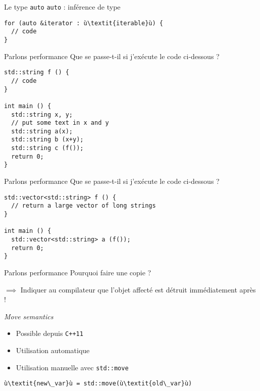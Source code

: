 \begin{frame}[fragile]{Le type \texttt{auto}}
  \texttt{auto} : inférence de type
  
  \begin{lstlisting}[escapechar=ù]
for (auto &iterator : ù\textit{iterable}ù) {
  // code
}
  \end{lstlisting}
\end{frame}

\begin{frame}[fragile]{Parlons performance}
  Que se passe-t-il si j'exécute le code ci-dessous ?
  
  \begin{lstlisting}
std::string f () {
  // code
}

int main () {
  std::string x, y;
  // put some text in x and y
  std::string a(x);
  std::string b (x+y);
  std::string c (f());
  return 0;
}
  \end{lstlisting}
\end{frame}

\begin{frame}[fragile]{Parlons performance}
  Que se passe-t-il si j'exécute le code ci-dessous ?
  
  \begin{lstlisting}
std::vector<std::string> f () {
  // return a large vector of long strings
}

int main () {
  std::vector<std::string> a (f());
  return 0;
}
  \end{lstlisting}
\end{frame}

\begin{frame}{Parlons performance}
  Pourquoi faire une copie ?

  $\implies$ Indiquer au compilateur que l'objet affecté est détruit immédiatement après !
\end{frame}

\begin{frame}[fragile]{\textit{Move semantics}}
  \begin{itemize}
  \item Possible depuis \texttt{C++11}
  \item Utilisation automatique
  \item Utilisation manuelle avec \texttt{std::move}
  \end{itemize}
  
  \begin{lstlisting}[escapechar=ù]
ù\textit{new\_var}ù = std::move(ù\textit{old\_var}ù)
  \end{lstlisting}
\end{frame}

